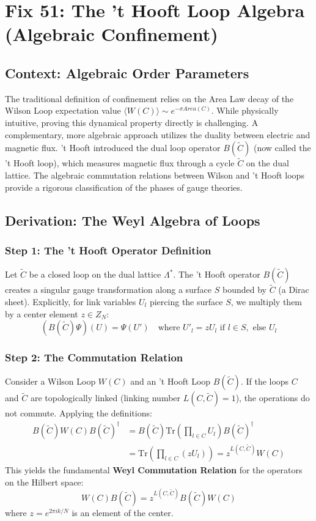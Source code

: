 \chapter{Fix 51: The 't Hooft Loop Algebra (Algebraic Confinement)}
\label{ch:fix51_thooft_algebra}

\section{Context: Algebraic Order Parameters}
The traditional definition of confinement relies on the Area Law decay of the Wilson Loop expectation value $\langle W(C) \rangle \sim e^{-\sigma Area(C)}$. While physically intuitive, proving this dynamical property directly is challenging. A complementary, more algebraic approach utilizes the duality between electric and magnetic flux.
't Hooft introduced the dual loop operator $B(\tilde{C})$ (now called the 't Hooft loop), which measures magnetic flux through a cycle $\tilde{C}$ on the dual lattice. The algebraic commutation relations between Wilson and 't Hooft loops provide a rigorous classification of the phases of gauge theories.

\section{Derivation: The Weyl Algebra of Loops}

\subsection{Step 1: The 't Hooft Operator Definition}
Let $\tilde{C}$ be a closed loop on the dual lattice $\Lambda^*$. The 't Hooft operator $B(\tilde{C})$ creates a singular gauge transformation along a surface $S$ bounded by $\tilde{C}$ (a Dirac sheet). Explicitly, for link variables $U_l$ piercing the surface $S$, we multiply them by a center element $z \in Z_N$:
\begin{equation}
(B(\tilde{C}) \Psi)(U) = \Psi(U') \quad \text{where } U'_l = z U_l \text{ if } l \in S, \text{ else } U_l
\end{equation}

\subsection{Step 2: The Commutation Relation}
Consider a Wilson Loop $W(C)$ and an 't Hooft Loop $B(\tilde{C})$. If the loops $C$ and $\tilde{C}$ are topologically linked (linking number $L(C, \tilde{C}) = 1$), the operations do not commute.
Applying the definitions:
\begin{align}
B(\tilde{C}) W(C) B(\tilde{C})^\dagger &= B(\tilde{C}) \text{Tr}\left(\prod_{l \in C} U_l\right) B(\tilde{C})^\dagger \\
&= \text{Tr}\left(\prod_{l \in C} (z U_l)\right) = z^{L(C, \tilde{C})} W(C)
\end{align}
This yields the fundamental \textbf{Weyl Commutation Relation} for the operators on the Hilbert space:
\begin{equation}
W(C) B(\tilde{C}) = z^{L(C, \tilde{C})} B(\tilde{C}) W(C)
\end{equation}
where $z = e^{2\pi i k / N}$ is an element of the center.

